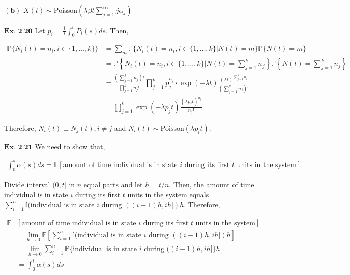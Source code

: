 \documentclass{article}
\begin{document}
$\mathbf{(b)}$
$X(t) \sim \text{Poisson}(\lambda\beta t\sum_{j=1}^{\infty}j\alpha_j)$

\vspace{0.2in}
${\textbf{Ex. 2.20}}$
Let $p_i = \frac{1}{t}\int_{0}^{t}P_{i}(s)ds$. Then,

\begin{align*}
\mathbb{P}\{N_{i}(t)=n_i, i \in \{1,\ldots,k\}\} &= \sum_{m}\mathbb{P}\{N_{i}(t)=n_i, i \in \{1,\ldots,k\}|N(t)=m\}\mathbb{P}\{N(t)=m\}\\
&= \mathbb{P}\left\{N_{i}(t)=n_i, i \in \{1,\ldots,k\}|N(t)=\sum_{j=1}^{k}n_j\right\}\mathbb{P}\left\{N(t)=\sum_{j=1}^{k}n_j\right\}\\
&= \frac{\left(\sum_{j=1}^{k}n_j\right)!}{\prod_{j=1}^{k}n_j!}\prod_{j=1}^{k}p_j^{n_j}\cdot \exp\left(-\lambda t\right) \frac{(\lambda t)^{\sum_{j=1}^{k}n_j}}{\left(\sum_{j=1}^{k}n_j\right)!}\\
&= \prod_{j=1}^{k}\exp(-\lambda p_j t) \frac{(\lambda p_j t)^{n_j}}{n_j!}
\end{align*}

Therefore, $N_{i}(t) \perp N_{j}(t), i \neq j$ and $N_{i}(t) \sim \text{Poisson}(\lambda p_i t)$.

\vspace{0.2in}
${\textbf{Ex. 2.21}}$
We need to show that,

\begin{align*}
\int_{0}^{s}\alpha(s)ds = \mathbb{E}[\text{amount of time individual is in state $i$ during its first $t$ units in the system}]
\end{align*}

Divide interval $(0,t]$ in $n$ equal parts and let $h = t/n$. Then, the amount of time individual is in state $i$ during its first $t$ units in the system equals $\sum_{i=1}^{n}\mathbb{I}(\text{individual is in state $i$ during }((i-1)h,ih])h$. Therefore,

\begin{align*}
\mathbb{E}&[\text{amount of time individual is in state $i$ during its first $t$ units in the system}] = \\
&\ \ \ \ \ \lim_{h\rightarrow 0}\mathbb{E}[\sum_{i=1}^{n}\mathbb{I}(\text{individual is in state $i$ during }((i-1)h,ih])h]\\
&= \lim_{h\rightarrow 0}\sum_{i=1}^{n}\mathbb{P}\{\text{individual is in state $i$ during }((i-1)h,ih]\}h\\
&= \int_{0}^{t}\alpha(s)ds
\end{align*}
\end{document}
